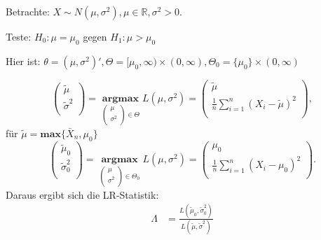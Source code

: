 \documentclass[10pt]{article}
\newcommand{\IR}{\mathbb{R}} %
\newcommand{\sni}{\sum_{i=1}^{n}} %
\newenvironment{BSP}[1][]
{\begin{Beispiel}[frametitle=#1]}{\end{Beispiel}}
\begin{document}
	\begin{BSP}[Beispiel 2.1.4 (t-Test mit einseitiger Alternative)]
	Betrachte: $X \sim N(\mu, \sigma^2), \mu \in \IR, \sigma^2 >0$.
	
	Teste: $H_0: \mu = \mu_0$ gegen $H_1: \mu > \mu_0$
	
	Hier ist: $\theta = (\mu, \sigma^2)', \Theta = [\mu_0, \infty) \times (0,\infty), \Theta_0 = \{\mu_0\} \times (0, \infty)$
	
		\begin{equation*}
		\left(\begin{array}{c}
			\tilde{\mu}\\
			\tilde{\sigma}^2\\
		\end{array}\right) = \; \underset{	\left(\begin{array}{c}
				\mu\\
				\sigma^2\\
			\end{array}\right) \in \Theta}{\textbf{argmax}} \; L(\mu, \sigma^2) = \left(\begin{array}{c}
			\tilde{\mu}\\
			\frac{1}{n} \sni (X_i - \tilde{\mu})^2\\
		\end{array}\right),
	\end{equation*}
	für $\tilde{\mu} = \textbf{max}\{\bar{X}_n, \mu_0\}$
	\begin{equation*}
		\left(\begin{array}{c}
			\tilde{\mu}_0\\
			\tilde{\sigma}_0^2\\
		\end{array}\right) = \; \underset{	\left(\begin{array}{c}
				\mu\\
				\sigma^2\\
			\end{array}\right) \in \Theta_0}{\textbf{argmax}} \; L(\mu, \sigma^2) = \left(\begin{array}{c}
			\mu_0\\
			\frac{1}{n} \sni (X_i - \mu_0)^2\\
		\end{array}\right).
	\end{equation*}
	Daraus ergibt sich die LR-Statistik:
	\begin{equation*}
		\begin{split}
			\Lambda &= \frac{L(\tilde{\mu}_0, \tilde{\sigma}^2_0)}{L(\tilde{\mu}, \tilde{\sigma}^2)}\\

\end{split}
\end{equation*}
\end{BSP}
\end{document}
